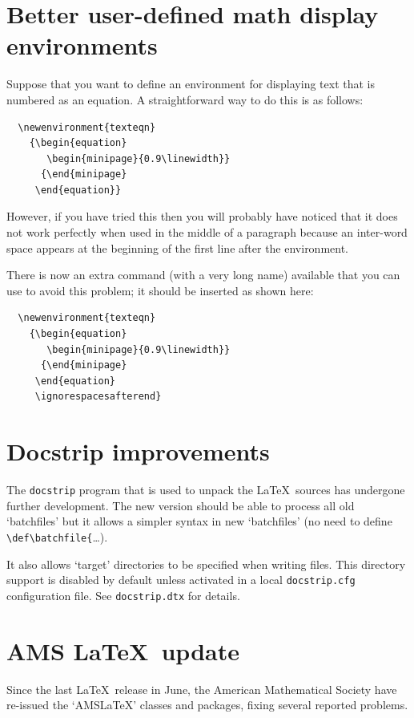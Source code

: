 \documentclass{ltnews}
\providecommand\pkg[1]{\texttt{#1}}
\providecommand\file[1]{\texttt{#1}}
\begin{document}
\section{Better user-defined math display environments}
Suppose that you want to define an environment for displaying text
that is numbered as an equation.  A straightforward way to do this is
as follows:
\begin{verbatim}
  \newenvironment{texteqn}
    {\begin{equation}
       \begin{minipage}{0.9\linewidth}}
      {\end{minipage}
     \end{equation}}
\end{verbatim}
However, if you have tried this then you will probably have noticed
that it does not work perfectly when used in the middle of a paragraph
because an inter-word space appears at the beginning of the first
line after the environment.

There is now an extra command (with a very long name) available that
you can use to avoid this problem; it should be inserted as shown here:
\begin{verbatim}
  \newenvironment{texteqn}
    {\begin{equation}
       \begin{minipage}{0.9\linewidth}}
      {\end{minipage}
     \end{equation}
     \ignorespacesafterend}
\end{verbatim}

\section{Docstrip improvements}
The \pkg{docstrip} program that is used to unpack the \LaTeX\
sources has undergone further development. The new version should be
able to process all old `batchfiles' but it allows a simpler syntax in
new `batchfiles' (no need to define \verb|\def\batchfile{|\ldots).

It also allows `target' directories to be specified when writing
files.  This directory support is disabled by default unless activated
in a local \file{docstrip.cfg} configuration file.
See \file{docstrip.dtx} for details.

\section{AMS \LaTeX\ update}
Since the last \LaTeX\ release in June, the American Mathematical
Society have re-issued the `AMS\LaTeX' classes and packages, fixing
several reported problems.
\end{document}
